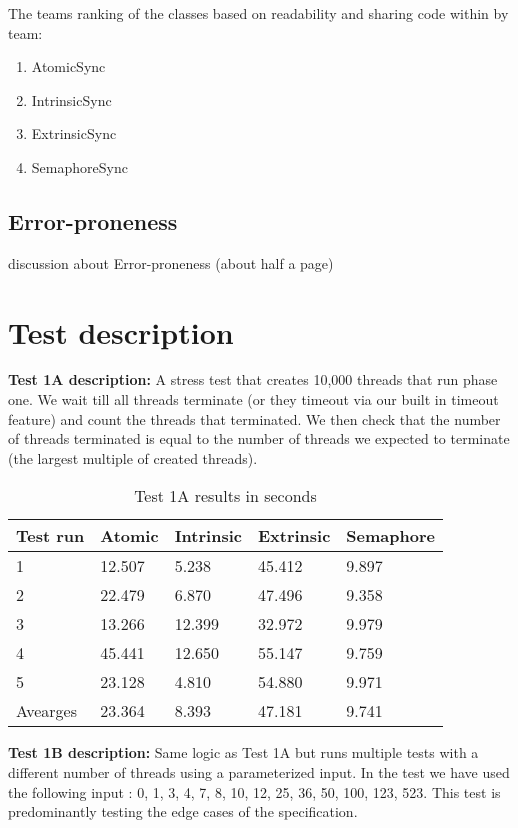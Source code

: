 \documentclass[11pt]{article}
\begin{document}
The teams ranking of the classes based on readability and sharing code within by team: 

\begin{enumerate}
	\item AtomicSync
	\item IntrinsicSync
	\item ExtrinsicSync
	\item SemaphoreSync
\end{enumerate}

\pagebreak
\subsection{Error-proneness}
discussion about Error-proneness (about half a page)

\newpage
\appendix
\section{Test description}
\textbf{Test 1A description:} A stress test that creates 10,000 threads that run phase one. We wait till all threads terminate (or they timeout via our built in timeout feature) and count the threads that terminated. We then check that the number of threads terminated is equal to the number of threads we expected to terminate (the largest multiple of created threads).\\



\begin{table}[H]
\centering
\caption{Test 1A results in seconds}
\label{tab:my-table}
\begin{tabular}{|l|l|l|l|l|}
\hline
Test run & Atomic & Intrinsic & Extrinsic & Semaphore \\ \hline
1        & 12.507 & 5.238     & 45.412    & 9.897     \\ \hline
2        & 22.479 & 6.870     & 47.496    & 9.358     \\ \hline
3        & 13.266 & 12.399    & 32.972    & 9.979     \\ \hline
4        & 45.441 & 12.650    & 55.147    & 9.759     \\ \hline
5        & 23.128 & 4.810     & 54.880    & 9.971     \\ \hline
Avearges & 23.364 & 8.393     & 47.181    & 9.741     \\ \hline
\end{tabular}
\end{table}

\textbf{Test 1B description:} Same logic as Test 1A but runs multiple tests with a different number of threads using a parameterized input. In the test we have used the following input : {0, 1, 3, 4, 7, 8, 10, 12, 25, 36, 50, 100, 123, 523}. This test is predominantly testing the edge cases of the specification. \\
\end{document}
